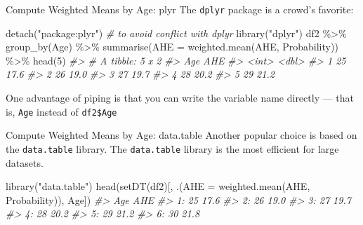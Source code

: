 \documentclass[
  11pt,
  ignorenonframetext,
  svgnames, handout, t]{beamer}
\newenvironment{Shaded}{\begin{snugshade}}{\end{snugshade}}
\newcommand{\AttributeTok}[1]{\textcolor[rgb]{0.77,0.63,0.00}{#1}}
\newcommand{\CommentTok}[1]{\textcolor[rgb]{0.56,0.35,0.01}{\textit{#1}}}
\newcommand{\DecValTok}[1]{\textcolor[rgb]{0.00,0.00,0.81}{#1}}
\newcommand{\FunctionTok}[1]{\textcolor[rgb]{0.00,0.00,0.00}{#1}}
\newcommand{\NormalTok}[1]{#1}
\newcommand{\SpecialCharTok}[1]{\textcolor[rgb]{0.00,0.00,0.00}{#1}}
\newcommand{\StringTok}[1]{\textcolor[rgb]{0.31,0.60,0.02}{#1}}
\begin{document}
\begin{frame}[fragile]{Compute Weighted Means by Age: plyr}
\protect\hypertarget{compute-weighted-means-by-age-plyr}{}
The \texttt{dplyr} package is a crowd's favorite:

\footnotesize

\begin{Shaded}
\begin{Highlighting}[]
\FunctionTok{detach}\NormalTok{(}\StringTok{"package:plyr"}\NormalTok{)  }\CommentTok{\# to avoid conflict with dplyr}
\FunctionTok{library}\NormalTok{(}\StringTok{"dplyr"}\NormalTok{)}
\NormalTok{df2 }\SpecialCharTok{\%\textgreater{}\%}
    \FunctionTok{group\_by}\NormalTok{(Age) }\SpecialCharTok{\%\textgreater{}\%}
    \FunctionTok{summarise}\NormalTok{(}\AttributeTok{AHE =} \FunctionTok{weighted.mean}\NormalTok{(AHE, Probability)) }\SpecialCharTok{\%\textgreater{}\%}
    \FunctionTok{head}\NormalTok{(}\DecValTok{5}\NormalTok{)}
\CommentTok{\#\textgreater{} \# A tibble: 5 x 2}
\CommentTok{\#\textgreater{}     Age   AHE}
\CommentTok{\#\textgreater{}   \textless{}int\textgreater{} \textless{}dbl\textgreater{}}
\CommentTok{\#\textgreater{} 1    25  17.6}
\CommentTok{\#\textgreater{} 2    26  19.0}
\CommentTok{\#\textgreater{} 3    27  19.7}
\CommentTok{\#\textgreater{} 4    28  20.2}
\CommentTok{\#\textgreater{} 5    29  21.2}
\end{Highlighting}
\end{Shaded}

\normalsize One advantage of piping is that you can write the variable
name directly --- that is, \texttt{Age} instead of \texttt{df2\$Age}
\end{frame}

\begin{frame}[fragile]{Compute Weighted Means by Age: data.table}
\protect\hypertarget{compute-weighted-means-by-age-data.table}{}
Another popular choice is based on the \texttt{data.table} library. The
\texttt{data.table} library is the most efficient for large datasets.

\footnotesize

\begin{Shaded}
\begin{Highlighting}[]
\FunctionTok{library}\NormalTok{(}\StringTok{"data.table"}\NormalTok{)}
\FunctionTok{head}\NormalTok{(}\FunctionTok{setDT}\NormalTok{(df2)[, .(}\AttributeTok{AHE =} \FunctionTok{weighted.mean}\NormalTok{(AHE, Probability)), Age])}
\CommentTok{\#\textgreater{}    Age  AHE}
\CommentTok{\#\textgreater{} 1:  25 17.6}
\CommentTok{\#\textgreater{} 2:  26 19.0}
\CommentTok{\#\textgreater{} 3:  27 19.7}
\CommentTok{\#\textgreater{} 4:  28 20.2}
\CommentTok{\#\textgreater{} 5:  29 21.2}
\CommentTok{\#\textgreater{} 6:  30 21.8}
\end{Highlighting}
\end{Shaded}

\normalsize
\end{frame}
\end{document}
